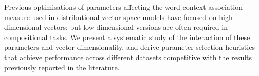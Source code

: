 Previous optimisations of parameters affecting the word-context association measure used in distributional vector space models have focused on high-dimensional vectors; but low-dimensional versions are often required in compositional tasks. We present a systematic study of the interaction of these parameters and vector dimensionality, and derive parameter selection heuristics that achieve performance across different datasets competitive with the results previously reported in the literature.
